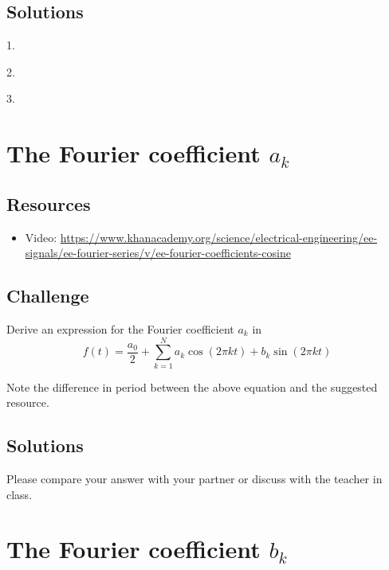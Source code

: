 \subsection*{Solutions}
1.\\

2.\\

3.\\




\newpage
\section{The Fourier coefficient $a_k$}

\subsection*{Resources}
\begin{itemize}
    \item Video: \url{https://www.khanacademy.org/science/electrical-engineering/ee-signals/ee-fourier-series/v/ee-fourier-coefficients-cosine}
\end{itemize}

\subsection*{Challenge}
Derive an expression for the Fourier coefficient $a_k$ in
\begin{equation}
    f(t) = \frac{a_0}{2} + \sum_{k=1}^{N} a_k \cos(2 \pi k t) + b_k \sin(2 \pi k t)
\end{equation}

Note the difference in period between the above equation and the suggested resource.

\subsection*{Solutions}
Please compare your answer with your partner or discuss with the teacher in class.




\newpage
\section{The Fourier coefficient $b_k$}

